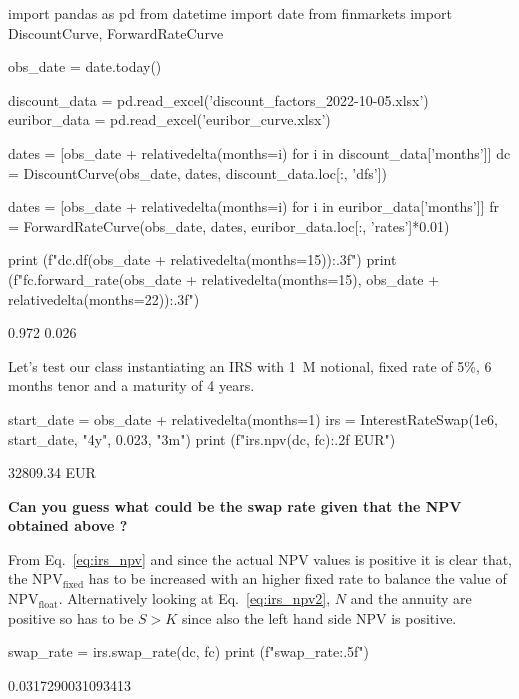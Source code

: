 \begin{ipython}
import pandas as pd
from datetime import date
from finmarkets import DiscountCurve, ForwardRateCurve

obs_date = date.today()

discount_data = pd.read_excel('discount_factors_2022-10-05.xlsx')
euribor_data = pd.read_excel('euribor_curve.xlsx')


dates = [obs_date + relativedelta(months=i) for i in discount_data['months']]
dc = DiscountCurve(obs_date, dates, discount_data.loc[:, 'dfs'])

dates = [obs_date + relativedelta(months=i) for i in euribor_data['months']]
fr = ForwardRateCurve(obs_date, dates, euribor_data.loc[:, 'rates']*0.01)

print (f"{dc.df(obs_date + relativedelta(months=15)):.3f}")
print (f"{fc.forward_rate(obs_date + relativedelta(months=15), 
	                      obs_date + relativedelta(months=22)):.3f}")
\end{ipython}
\begin{ioutput}
0.972
0.026
\end{ioutput}

Let's test our class instantiating an IRS with 1~M notional, fixed rate of 5\%, 6 months tenor and a maturity of 4 years.

\begin{ipython}
start_date = obs_date + relativedelta(months=1)
irs = InterestRateSwap(1e6, start_date, "4y", 0.023, "3m")
print (f"{irs.npv(dc, fc):.2f} EUR")
\end{ipython}
\begin{ioutput}
32809.34 EUR
\end{ioutput}

\textbf{Can you guess what could be the \textbf{swap rate} given that the NPV obtained above ?}

From Eq.~\ref{eq:irs_npv} and since the actual NPV values is positive it is clear that, the NPV$_{\textrm{fixed}}$ has to be increased with an higher fixed rate to balance the value of NPV$_{\textrm{float}}$.
Alternatively looking at Eq.~\ref{eq:irs_npv2}, $N$ and the annuity are positive so has to be $S> K$ since also the left hand side NPV is positive.  

\begin{ipython}
swap_rate = irs.swap_rate(dc, fc)
print (f"{swap_rate:.5f}")
\end{ipython}
\begin{ioutput}
0.0317290031093413
\end{ioutput}
    
